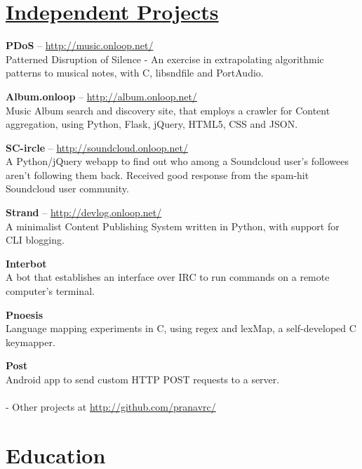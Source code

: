 \documentclass[10pt,a4paper]{moderncv}
\begin{document}
\section{{\href{http://www.github.com/pranavrc/}{Independent Projects}}}

\cvlistitem
{\textbf{PDoS} -- {{\href{http://music.onloop.net/}{\small http://music.onloop.net/}}}
  \\Patterned Disruption of Silence - An exercise in extrapolating algorithmic patterns to musical notes, with C, libsndfile and PortAudio.}

\cvlistitem
{\textbf{Album.onloop} -- {{\href{http://album.onloop.net/}{\small http://album.onloop.net/}}}
  \\Music Album search and discovery site, that employs a crawler for Content aggregation, using Python, Flask, jQuery, HTML5, CSS and JSON.}

\cvlistitem
{\textbf{SC-ircle} -- {{\href{http://soundcloud.onloop.net/}{\small http://soundcloud.onloop.net/}}}
  \\A Python/jQuery webapp to find out who among a Soundcloud user's followees aren't following them back. Received good response from the spam-hit Soundcloud user community.}

\cvlistitem
{\textbf{Strand} -- {{\href{http://devlog.onloop.net}{\small http://devlog.onloop.net/}}}
  \\A minimalist Content Publishing System written in Python, with support for CLI blogging.}

\cvlistitem
{\textbf{Interbot}
  \\A bot that establishes an interface over IRC to run commands on a remote computer's terminal.}

\cvlistitem
{\textbf{Pnoesis}
  \\Language mapping experiments in C, using regex and lexMap, a self-developed C keymapper.}

\cvlistitem
{\textbf{Post}
 \\Android app to send custom HTTP POST requests to a server.\\\\ - Other projects at {\href{http://github.com/pranavrc}{http://github.com/pranavrc/}}}


\section{Education}

\end{document}
